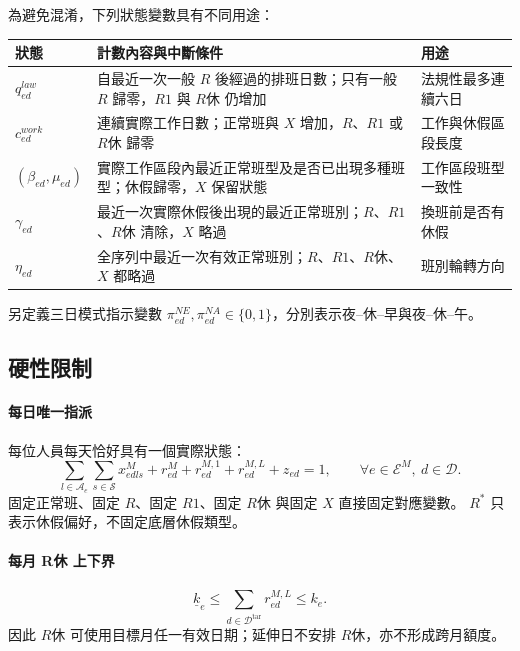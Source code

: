 \documentclass[a4paper,12pt]{article}
\begin{document}
為避免混淆，下列狀態變數具有不同用途：

\begin{center}
\small
\begin{tabularx}{\textwidth}{p{2.6cm}X X}
  \toprule
  狀態 & 計數內容與中斷條件 & 用途 \\
  \midrule
  \(q^{law}_{ed}\) & 自最近一次一般 \(R\) 後經過的排班日數；只有一般 \(R\) 歸零，\(R1\) 與 \(R休\) 仍增加 & 法規性最多連續六日 \\
  \(c^{work}_{ed}\) & 連續實際工作日數；正常班與 \(X\) 增加，\(R\)、\(R1\) 或 \(R休\) 歸零 & 工作與休假區段長度 \\
  \((\beta_{ed},\mu_{ed})\) & 實際工作區段內最近正常班型及是否已出現多種班型；休假歸零，\(X\) 保留狀態 & 工作區段班型一致性 \\
  \(\gamma_{ed}\) & 最近一次實際休假後出現的最近正常班別；\(R\)、\(R1\)、\(R休\) 清除，\(X\) 略過 & 換班前是否有休假 \\
  \(\eta_{ed}\) & 全序列中最近一次有效正常班別；\(R\)、\(R1\)、\(R休\)、\(X\) 都略過 & 班別輪轉方向 \\
  \bottomrule
\end{tabularx}
\normalsize
\end{center}

另定義三日模式指示變數
\(\pi^{NE}_{ed},\pi^{NA}_{ed}\in\{0,1\}\)，分別表示夜--休--早與夜--休--午。

\subsection{硬性限制}

\paragraph{每日唯一指派}
每位人員每天恰好具有一個實際狀態：
\[
  \sum_{l\in\mathcal{A}_e}\sum_{s\in\mathcal{S}}x^{M}_{edls}
  +r^{M}_{ed}+r^{M,1}_{ed}+r^{M,L}_{ed}+z_{ed}=1,
  \qquad
  \forall e\in\mathcal{E}^{M},\ d\in\mathcal{D}.
\]
固定正常班、固定 \(R\)、固定 \(R1\)、固定 \(R休\) 與固定 \(X\) 直接固定對應變數。
\(R^*\) 只表示休假偏好，不固定底層休假類型。

\paragraph{每月 R休 上下界}
\[
  \underline{k}_e\leq
  \sum_{d\in\mathcal{D}^{\mathrm{tar}}}r^{M,L}_{ed}\leq k_e.
\]
因此 \(R休\) 可使用目標月任一有效日期；延伸日不安排 \(R休\)，亦不形成跨月額度。
\end{document}
